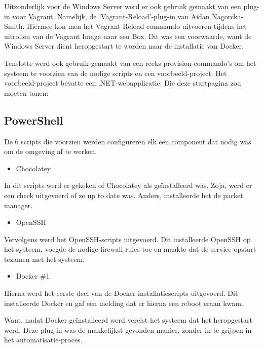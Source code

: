 
Uitzonderlijk voor de Windows Server werd er ook gebruik gemaakt van een plug-in voor Vagrant. Namelijk, de 'Vagrant-Reload'-plug-in van Aidan Nagorcka-Smith. Hiermee kon men het Vagrant Reload commando uitvoeren tijdens het uitrollen van de Vagrant Image naar een Box. Dit was een voorwaarde, want de Windows Server dient heropgestart te worden naar de installatie van Docker.


Tenslotte werd ook gebruik gemaakt van een reeks provision-commando's om het systeem te voorzien van de nodige scripts en een voorbeeld-project. Het voorbeeld-project bevatte een .NET-webapplicatie. Die deze startpagina zou moeten tonen:


\subsection{PowerShell}
De 6 scripts die voorzien werden configureren elk een component dat nodig was om de omgeving af te werken.

\begin{itemize}[noitemsep]
	\item Chocolatey
\end{itemize}

In dit scripts werd er gekeken of Chocolatey als geïnstalleerd was. Zoja, werd er een check uitgevoerd of ze up to date was. Anders, installeerde het de packet manager.

\begin{itemize}[noitemsep]
	\item OpenSSH
\end{itemize}

Vervolgens werd het OpenSSH-scripts uitgevoerd. Dit installeerde OpenSSH op het systeem, voegde de nodige firewall rules toe en maakte dat de service opstart tezamen met het systeem.

\begin{itemize}[noitemsep]
	\item Docker \#1
\end{itemize}

Hierna werd het eerste deel van de Docker installatiescripts uitgevoerd. Dit installeerde Docker en gaf een melding dat er hierna een reboot eraan kwam.

Want, nadat Docker geïnstalleerd werd vereist het systeem dat het heropgestart werd. Deze plug-in was de makkelijkst gevonden manier, zonder in te grijpen in het automatisatie-proces.

